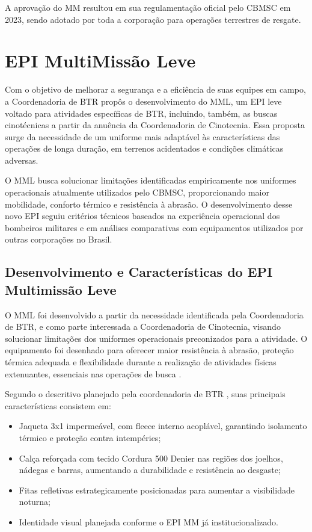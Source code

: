 A aprovação do \acrlong{MM} resultou em sua regulamentação oficial pelo \acrshort{CBMSC} em 2023, 
sendo adotado por toda a corporação para operações terrestres de resgate.

\section{EPI MultiMissão Leve}

Com o objetivo de melhorar a segurança e a eficiência de suas equipes em campo, a Coordenadoria de \acrlong{BTR} propôs o desenvolvimento do \acrfull{MML}, um \acrshort{EPI} leve voltado para atividades específicas de \acrlong{BTR}, incluindo, também, as buscas cinotécnicas a partir da anuência da Coordenadoria de Cinotecnia. Essa proposta surge da necessidade de um uniforme mais adaptável às características das operações de longa duração, em terrenos acidentados e condições climáticas adversas.

O \acrshort{MML} busca solucionar limitações identificadas empiricamente nos uniformes operacionais atualmente utilizados pelo \acrshort{CBMSC}, proporcionando maior mobilidade, conforto térmico e resistência à abrasão. O desenvolvimento desse novo \acrshort{EPI} seguiu critérios técnicos baseados na experiência operacional dos bombeiros militares e em análises comparativas com equipamentos utilizados por outras corporações no Brasil.

\subsection{Desenvolvimento e Características do EPI Multimissão Leve}
    O \acrlong{MML} foi desenvolvido a partir da necessidade identificada pela Coordenadoria de \acrshort{BTR}, e como parte interessada a Coordenadoria de Cinotecnia, visando solucionar limitações dos uniformes operacionais preconizados para a atividade. O equipamento foi desenhado para oferecer maior resistência à abrasão, proteção térmica adequada e flexibilidade durante a realização de atividades físicas extenuantes, essenciais nas operações de busca \cite{relMML}.

    Segundo o descritivo planejado pela coordenadoria de \acrlong{BTR} \cite{descritivoMML}, suas principais características consistem em:

\begin{itemize}
    \item Jaqueta 3x1 impermeável, com fleece interno acoplável, garantindo isolamento térmico e proteção contra intempéries;
    \item Calça reforçada com tecido Cordura 500 Denier nas regiões dos joelhos, nádegas e barras, aumentando a durabilidade e resistência ao desgaste;
    \item Fitas refletivas estrategicamente posicionadas para aumentar a visibilidade noturna;
    \item Identidade visual planejada conforme o \acrshort{EPI} \acrlong{MM} já institucionalizado.
\end{itemize}

